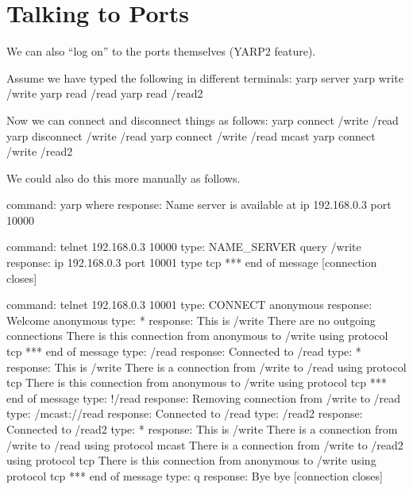 \documentclass[a4]{article}
\begin{document}







\section{Talking to Ports}


We can also ``log on'' to the ports themselves (YARP2 feature).

\begin{code}

Assume we have typed the following in different terminals:
  yarp server
  yarp write /write
  yarp read /read
  yarp read /read2

Now we can connect and disconnect things as follows:
  yarp connect /write /read
  yarp disconnect /write /read
  yarp connect /write /read mcast
  yarp connect /write /read2

We could also do this more manually as follows.

command:  yarp where
response: Name server is available at ip 192.168.0.3 port 10000


command:  telnet 192.168.0.3 10000
type:     NAME_SERVER query /write
response: ip 192.168.0.3 port 10001 type tcp
          *** end of message
          [connection closes]


command:  telnet 192.168.0.3 10001
type:     CONNECT anonymous
response: Welcome anonymous
type:     *
response: This is /write
          There are no outgoing connections
          There is this connection from anonymous to /write using protocol tcp
          *** end of message
type:     /read
response: Connected to /read
type:     *
response: This is /write
          There is a connection from /write to /read using protocol tcp
          There is this connection from anonymous to /write using protocol tcp
          *** end of message
type:     !/read
response: Removing connection from /write to /read
type:     /mcast://read
response: Connected to /read
type:     /read2
response: Connected to /read2
type:     *
response: This is /write
          There is a connection from /write to /read using protocol mcast
          There is a connection from /write to /read2 using protocol tcp
          There is this connection from anonymous to /write using protocol tcp
          *** end of message
type:     q
response: Bye bye
          [connection closes]



\end{code}
\end{document}
